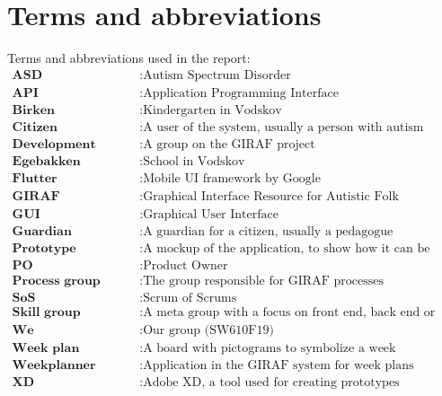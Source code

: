 \chapter*{Terms and abbreviations}
Terms and abbreviations used in the report:
\begin{align*}
    \textbf{ASD} &: \text{Autism Spectrum Disorder} \\
    \textbf{API} &: \text{Application Programming Interface} \\
    \textbf{Birken} &: \text{Kindergarten in Vodskov} \\
    \textbf{Citizen} &: \text{A user of the system, usually a person with autism} \\
    \textbf{Development group} &: \text{A group on the GIRAF project} \\
    \textbf{Egebakken} &: \text{School in Vodskov} \\
    \textbf{Flutter} &: \text{Mobile UI framework by Google} \\
    \textbf{GIRAF} &: \text{Graphical Interface Resource for Autistic Folk} \\
    \textbf{GUI} &: \text{Graphical User Interface} \\
    \textbf{Guardian} &: \text{A guardian for a citizen, usually a pedagogue} \\
    \textbf{Prototype} &: \text{A mockup of the application, to show how it can be implemented} \\
    \textbf{PO} &: \text{Product Owner} \\
    \textbf{Process group} &: \text{The group responsible for GIRAF processes} \\
    \textbf{SoS} &: \text{Scrum of Scrums} \\
    \textbf{Skill group} &: \text{A meta group with a focus on front end, back end or server} \\
    \textbf{We} &: \text{Our group (SW610F19)} \\
    \textbf{Week plan} &: \text{A board with pictograms to symbolize a week} \\
    \textbf{Weekplanner} &: \text{Application in the GIRAF system for week plans} \\
    \textbf{XD} &: \text{Adobe XD, a tool used for creating prototypes} \\
\end{align*}
